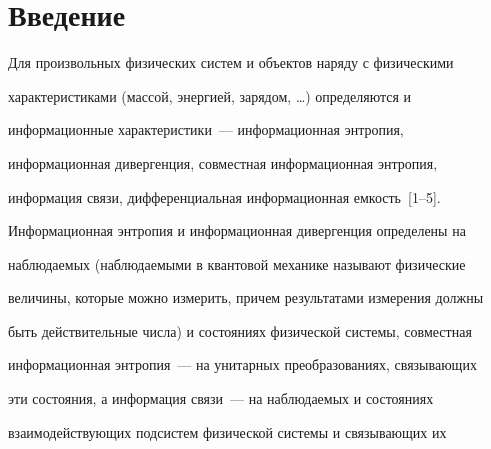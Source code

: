     




    










      \thispagestyle{headings}





      


            \label{st\stat}


            


            \vspace*{-12pt}


   


\section{Введение}





   Для произвольных физических систем и объектов наряду с физическими 


характеристиками (массой, энергией, зарядом, \ldots) определяются и 


информационные характеристики~--- информационная энтропия, 


информационная дивергенция, совместная информационная энтропия, 


информация связи, дифференциальная информационная емкость~[1--5]. 


Информационная энтропия и информационная дивергенция определены на 


наблюдаемых (наблюдаемыми в квантовой механике называют физические 


величины, которые можно измерить, причем результатами измерения должны 


быть действительные числа) и состояниях физической системы, совместная 


информационная энтропия~--- на унитарных преобразованиях, связывающих 


эти состояния, а информация связи~--- на наблюдаемых и состояниях 


взаимодействующих подсистем физической системы и связывающих их 


